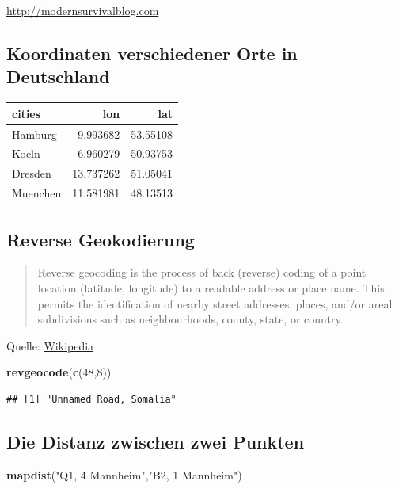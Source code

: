 \documentclass[]{article}
\newenvironment{Shaded}{\begin{snugshade}}{\end{snugshade}}
\newcommand{\KeywordTok}[1]{\textcolor[rgb]{0.13,0.29,0.53}{\textbf{{#1}}}}
\newcommand{\DecValTok}[1]{\textcolor[rgb]{0.00,0.00,0.81}{{#1}}}
\newcommand{\StringTok}[1]{\textcolor[rgb]{0.31,0.60,0.02}{{#1}}}
\newcommand{\NormalTok}[1]{{#1}}
\begin{document}
\href{http://modernsurvivalblog.com/survival-skills/basic-map-reading-latitude-longitude/}{http://modernsurvivalblog.com}

\subsection{Koordinaten verschiedener Orte in
Deutschland}\label{koordinaten-verschiedener-orte-in-deutschland}

\begin{longtable}[]{@{}lrr@{}}
\toprule
cities & lon & lat\tabularnewline
\midrule
\endhead
Hamburg & 9.993682 & 53.55108\tabularnewline
Koeln & 6.960279 & 50.93753\tabularnewline
Dresden & 13.737262 & 51.05041\tabularnewline
Muenchen & 11.581981 & 48.13513\tabularnewline
\bottomrule
\end{longtable}

\subsection{Reverse Geokodierung}\label{reverse-geokodierung}

\begin{quote}
Reverse geocoding is the process of back (reverse) coding of a point
location (latitude, longitude) to a readable address or place name. This
permits the identification of nearby street addresses, places, and/or
areal subdivisions such as neighbourhoods, county, state, or country.
\end{quote}

Quelle:
\href{https://en.wikipedia.org/wiki/Reverse_geocoding}{Wikipedia}

\begin{Shaded}
\begin{Highlighting}[]
\KeywordTok{revgeocode}\NormalTok{(}\KeywordTok{c}\NormalTok{(}\DecValTok{48}\NormalTok{,}\DecValTok{8}\NormalTok{))}
\end{Highlighting}
\end{Shaded}

\begin{verbatim}
## [1] "Unnamed Road, Somalia"
\end{verbatim}

\subsection{Die Distanz zwischen zwei
Punkten}\label{die-distanz-zwischen-zwei-punkten}

\begin{Shaded}
\begin{Highlighting}[]
\KeywordTok{mapdist}\NormalTok{(}\StringTok{"Q1, 4 Mannheim"}\NormalTok{,}\StringTok{"B2, 1 Mannheim"}\NormalTok{)}
\end{Highlighting}
\end{Shaded}
\end{document}
